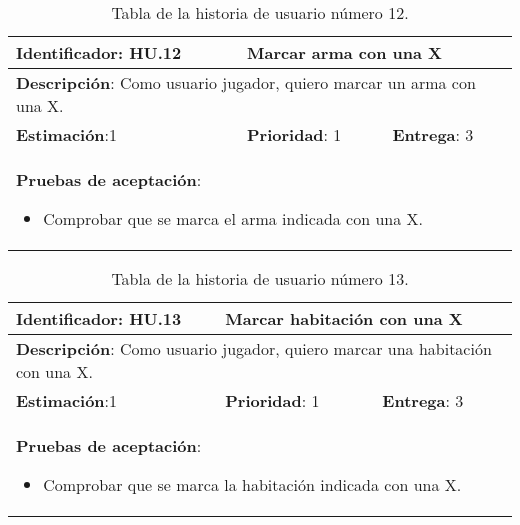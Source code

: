 \begin{table}[h]
  \begin{center}
    \begin{tabular}{|p{4cm}|p{4cm}|p{4cm}|}

    \hline
    \textbf{Identificador}: HU.12
    & \multicolumn{2}{p{8cm}|}{Marcar arma con una X}\\

    \hline
    \multicolumn{3}{|p{12cm}|}{\textbf{Descripción}: Como usuario jugador, quiero marcar un arma con una X.}\\

    \hline
    \textbf{Estimación}:1
    & \textbf{Prioridad}: 1
    & \textbf{Entrega}: 3\\

    \hline
    \multicolumn{3}{|p{12cm}|}{\textbf{Pruebas de aceptación}:
      \begin{itemize}
        \item Comprobar que se marca el arma indicada con una X.
      \end{itemize}
    }\\

    \hline

    \end{tabular}

    \caption{Tabla de la historia de usuario número 12.}
    \label{tabla-hu12}

  \end{center}
\end{table}

\begin{table}[h]
  \begin{center}
    \begin{tabular}{|p{4cm}|p{4cm}|p{4cm}|}

    \hline
    \textbf{Identificador}: HU.13
    & \multicolumn{2}{p{8cm}|}{Marcar habitación con una X}\\

    \hline
    \multicolumn{3}{|p{12cm}|}{\textbf{Descripción}: Como usuario jugador, quiero marcar una habitación con una X.}\\

    \hline
    \textbf{Estimación}:1
    & \textbf{Prioridad}: 1
    & \textbf{Entrega}: 3\\

    \hline
    \multicolumn{3}{|p{12cm}|}{\textbf{Pruebas de aceptación}:
      \begin{itemize}
        \item Comprobar que se marca la habitación indicada con una X.
      \end{itemize}
    }\\

    \hline

    \end{tabular}

    \caption{Tabla de la historia de usuario número 13.}
    \label{tabla-hu13}

  \end{center}
\end{table}

